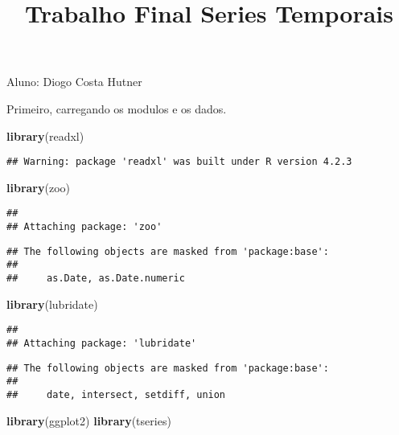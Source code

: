\documentclass[
]{article}
\title{Trabalho Final Series Temporais}
\author{}
\date{\vspace{-2.5em}}
\newenvironment{Shaded}{\begin{snugshade}}{\end{snugshade}}
\newcommand{\FunctionTok}[1]{\textcolor[rgb]{0.13,0.29,0.53}{\textbf{#1}}}
\newcommand{\NormalTok}[1]{#1}
\begin{document}
\maketitle

Aluno: Diogo Costa Hutner

Primeiro, carregando os modulos e os dados.

\begin{Shaded}
\begin{Highlighting}[]
\FunctionTok{library}\NormalTok{(readxl)}
\end{Highlighting}
\end{Shaded}

\begin{verbatim}
## Warning: package 'readxl' was built under R version 4.2.3
\end{verbatim}

\begin{Shaded}
\begin{Highlighting}[]
\FunctionTok{library}\NormalTok{(zoo)}
\end{Highlighting}
\end{Shaded}

\begin{verbatim}
## 
## Attaching package: 'zoo'
\end{verbatim}

\begin{verbatim}
## The following objects are masked from 'package:base':
## 
##     as.Date, as.Date.numeric
\end{verbatim}

\begin{Shaded}
\begin{Highlighting}[]
\FunctionTok{library}\NormalTok{(lubridate)}
\end{Highlighting}
\end{Shaded}

\begin{verbatim}
## 
## Attaching package: 'lubridate'
\end{verbatim}

\begin{verbatim}
## The following objects are masked from 'package:base':
## 
##     date, intersect, setdiff, union
\end{verbatim}

\begin{Shaded}
\begin{Highlighting}[]
\FunctionTok{library}\NormalTok{(ggplot2)}
\FunctionTok{library}\NormalTok{(tseries)}
\end{Highlighting}
\end{Shaded}
\end{document}
